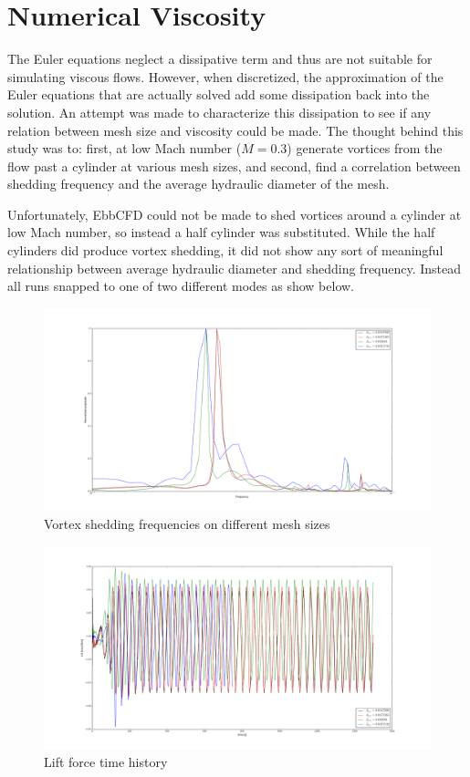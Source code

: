 \documentclass[12pt,parskip=full]{article}
\numberwithin{subsection}{section}
\begin{document}
	\section{Numerical Viscosity}
		The Euler equations neglect a dissipative term and thus are not suitable for simulating viscous flows. However, when
		discretized, the approximation of the Euler equations that are actually solved add some dissipation back into
		the solution. An attempt was made to characterize this dissipation to see if any relation between mesh size and
		viscosity could be made. The thought behind this study was to: first, at low Mach number ($M = 0.3$) generate vortices
		from the flow past a cylinder at various mesh sizes, and second, find a correlation between shedding frequency and 
		the average hydraulic diameter of the mesh.
		
		Unfortunately, EbbCFD could not be made to shed vortices around a cylinder at low Mach number, so instead a half cylinder
		was substituted. While the half cylinders did produce vortex shedding, it did not show any sort of meaningful 
		relationship between average hydraulic diameter and shedding frequency. Instead all runs snapped to one of two different
		modes as show below.

		\begin{figure}[H]
			\centering
			\includegraphics[width=\textwidth]{SheddingFrequency.pdf}
			\caption{Vortex shedding frequencies on different mesh sizes}
		\end{figure}
		\begin{figure}[H]
			\centering
			\includegraphics[width=\textwidth]{ForceTime.pdf}
			\caption{Lift force time history}
		\end{figure}
\end{document}
